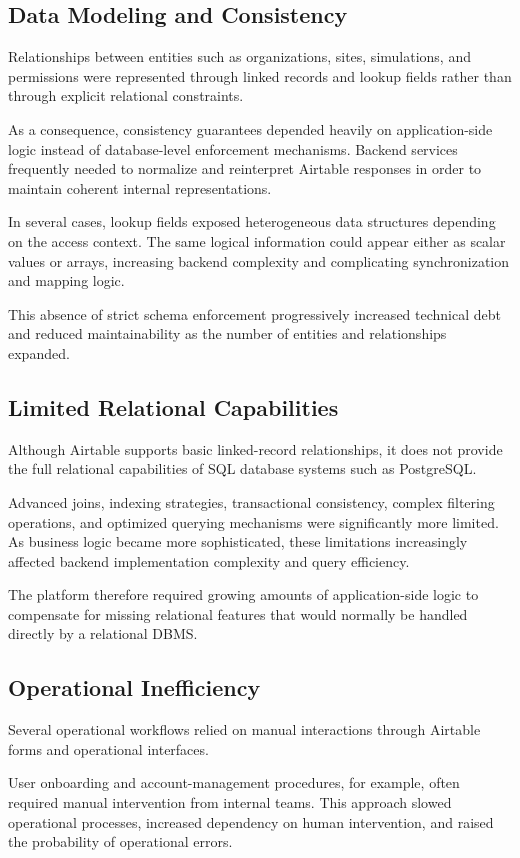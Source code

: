 \subsection{Data Modeling and Consistency}
Relationships between entities such as organizations, sites, simulations, and permissions were represented through linked records and lookup fields rather than through explicit relational constraints.

As a consequence, consistency guarantees depended heavily on application-side logic instead of database-level enforcement mechanisms. Backend services frequently needed to normalize and reinterpret Airtable responses in order to maintain coherent internal representations.

In several cases, lookup fields exposed heterogeneous data structures depending on the access context. The same logical information could appear either as scalar values or arrays, increasing backend complexity and complicating synchronization and mapping logic.

This absence of strict schema enforcement progressively increased technical debt and reduced maintainability as the number of entities and relationships expanded.

\subsection{Limited Relational Capabilities}
Although Airtable supports basic linked-record relationships, it does not provide the full relational capabilities of SQL database systems such as PostgreSQL.

Advanced joins, indexing strategies, transactional consistency, complex filtering operations, and optimized querying mechanisms were significantly more limited. As business logic became more sophisticated, these limitations increasingly affected backend implementation complexity and query efficiency.

The platform therefore required growing amounts of application-side logic to compensate for missing relational features that would normally be handled directly by a relational DBMS.

\subsection{Operational Inefficiency}
Several operational workflows relied on manual interactions through Airtable forms and operational interfaces.

User onboarding and account-management procedures, for example, often required manual intervention from internal teams. This approach slowed operational processes, increased dependency on human intervention, and raised the probability of operational errors.

